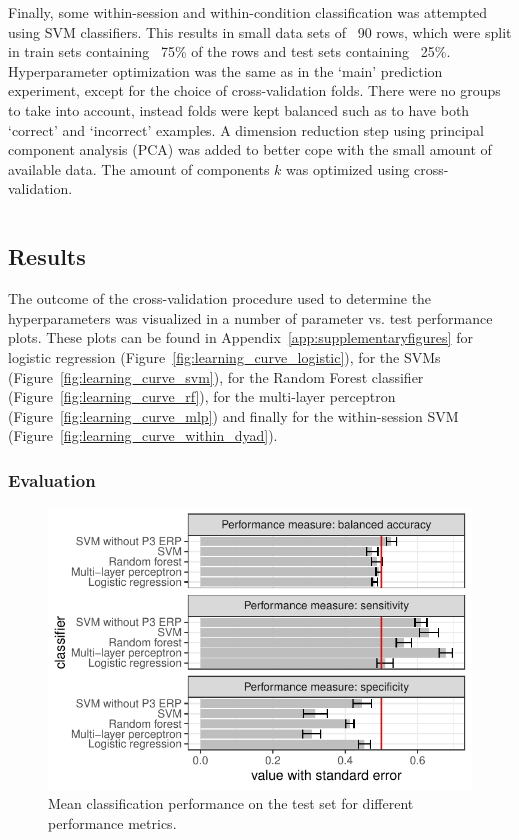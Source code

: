Finally, some within-session and within-condition classification was attempted
using SVM classifiers. This results in small data sets of ~90 rows, which were
split in train sets containing ~75\% of the rows and test sets containing ~25\%.
Hyperparameter optimization was the same as in the `main' prediction experiment,
except for the choice of cross-validation folds. There were no groups to take
into account, instead folds were kept balanced such as to have both `correct'
and `incorrect' examples. A dimension reduction step using principal component
analysis (PCA) was added to better cope with the small amount of available data.
The amount of components $k$ was optimized using cross-validation.

\begin{verbatim}
\end{verbatim}

\subsection{Results}

The outcome of the cross-validation procedure used to determine the
hyperparameters was visualized in a number of parameter vs. test performance
plots. These plots can be found in Appendix~\ref{app:supplementaryfigures} for
logistic regression (Figure~\ref{fig:learning_curve_logistic}), for the SVMs
(Figure~\ref{fig:learning_curve_svm}), for the Random Forest classifier
(Figure~\ref{fig:learning_curve_rf}), for the multi-layer perceptron
(Figure~\ref{fig:learning_curve_mlp}) and finally for the within-session SVM
(Figure~\ref{fig:learning_curve_within_dyad}).

\subsubsection{Evaluation}

\begin{figure}[!htpb]
  \includegraphics[width=\linewidth]{../stats/results/evaluation_avg.pdf}
  \caption{Mean classification performance on the test set for different performance metrics.}
  \label{fig:evaluation_avg}
\end{figure}

